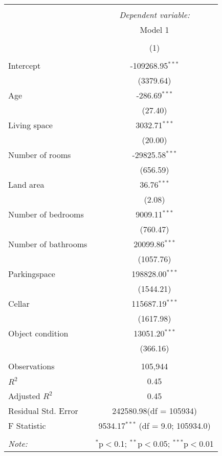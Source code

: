 \begin{table}[!htbp] \centering
\begin{tabular}{@{\extracolsep{5pt}}lc}
\\[-1.8ex]\hline
\hline \\[-1.8ex]
& \multicolumn{1}{c}{\textit{Dependent variable:}} \
\cr \cline{1-2}
\\[-1.8ex] & \multicolumn{1}{c}{Model 1} \\\\[-1.8ex] & (1) \\
\hline \\[-1.8ex]
 Intercept & -109268.95$^{***}$ \\
  & (3379.64) \\
 Age & -286.69$^{***}$ \\
  & (27.40) \\
 Living space & 3032.71$^{***}$ \\
  & (20.00) \\
 Number of rooms & -29825.58$^{***}$ \\
  & (656.59) \\
 Land area & 36.76$^{***}$ \\
  & (2.08) \\
 Number of bedrooms & 9009.11$^{***}$ \\
  & (760.47) \\
 Number of bathrooms & 20099.86$^{***}$ \\
  & (1057.76) \\
 Parkingspace & 198828.00$^{***}$ \\
  & (1544.21) \\
 Cellar & 115687.19$^{***}$ \\
  & (1617.98) \\
 Object condition & 13051.20$^{***}$ \\
  & (366.16) \\
\hline \\[-1.8ex]
 Observations & 105,944 \\
 $R^2$ & 0.45 \\
 Adjusted $R^2$ & 0.45 \\
 Residual Std. Error & 242580.98(df = 105934)  \\
 F Statistic & 9534.17$^{***}$ (df = 9.0; 105934.0) \\
\hline
\hline \\[-1.8ex]
\textit{Note:} & \multicolumn{1}{r}{$^{*}$p$<$0.1; $^{**}$p$<$0.05; $^{***}$p$<$0.01} \\
\end{tabular}
\end{table}